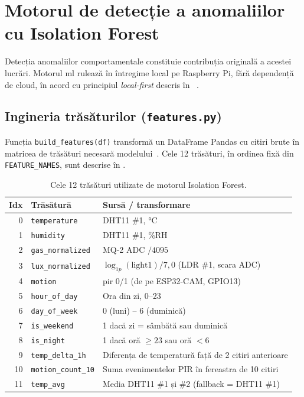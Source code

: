 \section{Motorul de detecție a anomaliilor cu Isolation Forest}
\label{sec:motor-ml}

Detecția anomaliilor comportamentale constituie contribuția originală a
acestei lucrări.
Motorul \gls{ml} rulează în întregime local pe Raspberry Pi, fără
dependență de cloud, în acord cu principiul \emph{local-first}
descris în ~\cite{liu2008isolation,pedregosa2011scikit}.

\subsection{Ingineria trăsăturilor (\texttt{features.py})}
\label{sec:features}

Funcția \texttt{build\_features(df)} transformă un DataFrame Pandas cu
citiri brute în matricea de trăsături necesară modelului~\cite{mckinney2010pandas}.
Cele 12 trăsături, în ordinea fixă din \texttt{FEATURE\_NAMES}, sunt
descrise în .

\begin{table}[H]
  \centering
  \caption{Cele 12 trăsături utilizate de motorul Isolation Forest.}
  \label{tab:features-cod}
  \begin{tabular}{@{} r l p{6.5cm} @{}}
    \toprule
    \textbf{Idx} & \textbf{Trăsătură} & \textbf{Sursă / transformare} \\
    \midrule
    0  & \texttt{temperature}      & DHT11 \#1, °C \\
    1  & \texttt{humidity}         & DHT11 \#1, \%RH \\
    2  & \texttt{gas\_normalized}  & MQ-2 ADC $/ 4095$ \\
    3  & \texttt{lux\_normalized}  & $\log_{1p}(\text{light1}) / 7{,}0$ (LDR \#1, scara ADC) \\
    4  & \texttt{motion}           & \gls{pir} 0/1 (de pe ESP32-CAM, GPIO13) \\
    5  & \texttt{hour\_of\_day}    & Ora din zi, 0–23 \\
    6  & \texttt{day\_of\_week}    & 0 (luni) – 6 (duminică) \\
    7  & \texttt{is\_weekend}      & 1 dacă zi = sâmbătă sau duminică \\
    8  & \texttt{is\_night}        & 1 dacă oră $\geq 23$ sau oră $< 6$ \\
    9  & \texttt{temp\_delta\_1h}  & Diferența de temperatură față de 2 citiri anterioare \\
    10 & \texttt{motion\_count\_10}& Suma evenimentelor PIR în fereastra de 10 citiri \\
    11 & \texttt{temp\_avg}        & Media DHT11 \#1 și \#2 (fallback = DHT11 \#1) \\
    \bottomrule
  \end{tabular}
\end{table}

